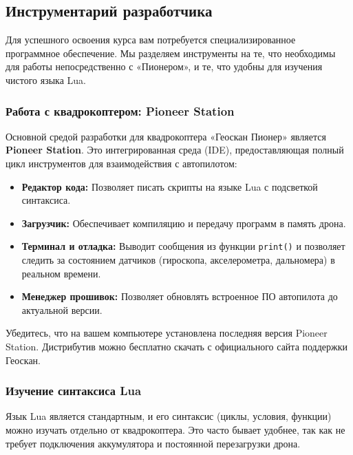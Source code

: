 \subsection{Инструментарий разработчика}

Для успешного освоения курса вам потребуется специализированное программное обеспечение. Мы разделяем инструменты на те, что необходимы для работы непосредственно с «Пионером», и те, что удобны для изучения чистого языка Lua.

\subsubsection{Работа с квадрокоптером: Pioneer Station}

Основной средой разработки для квадрокоптера «Геоскан Пионер» является \textbf{Pioneer Station}. Это интегрированная среда (IDE), предоставляющая полный цикл инструментов для взаимодействия с автопилотом:

\begin{itemize}
    \item \textbf{Редактор кода:} Позволяет писать скрипты на языке Lua с подсветкой синтаксиса.
    \item \textbf{Загрузчик:} Обеспечивает компиляцию и передачу программ в память дрона.
    \item \textbf{Терминал и отладка:} Выводит сообщения из функции \texttt{print()} и позволяет следить за состоянием датчиков (гироскопа, акселерометра, дальномера) в реальном времени.
    \item \textbf{Менеджер прошивок:} Позволяет обновлять встроенное ПО автопилота до актуальной версии.
\end{itemize}

\begin{infobox}[Установка]
    Убедитесь, что на вашем компьютере установлена последняя версия Pioneer Station. Дистрибутив можно бесплатно скачать с официального сайта поддержки Геоскан.
\end{infobox}

\subsubsection{Изучение синтаксиса Lua}

Язык Lua является стандартным, и его синтаксис (циклы, условия, функции) можно изучать отдельно от квадрокоптера. Это часто бывает удобнее, так как не требует подключения аккумулятора и постоянной перезагрузки дрона.

